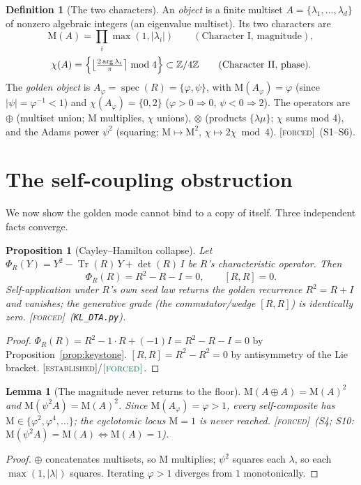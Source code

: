 \documentclass[11pt]{article}
\theoremstyle{plain}
\newtheorem{proposition}[theorem]{Proposition}
\newtheorem{lemma}[theorem]{Lemma}
\theoremstyle{definition}
\newtheorem{definition}[theorem]{Definition}
\theoremstyle{remark}
\newcommand{\forced}{\textup{\textcolor{forcedc}{\textsc{[forced]}}}}
\newcommand{\established}{\textup{\textcolor{estabc}{\textsc{[established]}}}}
\newcommand{\Z}{\mathbb{Z}}
\newcommand{\tr}{\operatorname{Tr}}
\newcommand{\Mah}{\mathrm{M}}
\newcommand{\abs}[1]{\left\lvert #1 \right\rvert}
\begin{document}
\begin{definition}[The two characters]\label{def:chars}
An \emph{object} is a finite multiset $A=\{\lambda_1,\dots,\lambda_d\}$ of nonzero algebraic integers
(an eigenvalue multiset). Its two characters are
\[
\Mah(A)=\prod_i\max(1,\abs{\lambda_i})\qquad(\text{Character I, magnitude}),
\]
\[
\chi(A)=\Bigl\{\bigl\lfloor \tfrac{2\arg\lambda_i}{\pi}\bigr\rceil \bmod 4\Bigr\}\subset\Z/4\Z
\qquad(\text{Character II, phase}).
\]
The \emph{golden object} is $A_\varphi=\operatorname{spec}(R)=\{\varphi,\psi\}$, with
$\Mah(A_\varphi)=\varphi$ (since $\abs\psi=\varphi^{-1}<1$) and $\chi(A_\varphi)=\{0,2\}$
($\varphi>0\Rightarrow0$, $\psi<0\Rightarrow2$). The operators are $\oplus$ (multiset union;
$\Mah$ multiplies, $\chi$ unions), $\otimes$ (products $\{\lambda\mu\}$; $\chi$ sums mod $4$), and the
Adams power $\psi^2$ (squaring; $\Mah\mapsto\Mah^2$, $\chi\mapsto 2\chi \bmod 4$). \forced\ (S1--S6).
\end{definition}

\section{The self-coupling obstruction}\label{sec:obstruction}

We now show the golden mode cannot bind to a copy of itself. Three independent facts converge.

\begin{proposition}[Cayley--Hamilton collapse]\label{prop:collapse}
Let $\Phi_R(Y)=Y^2-\tr(R)\,Y+\det(R)\,I$ be $R$'s characteristic operator. Then
\begin{equation}\label{eq:phicollapse}
\Phi_R(R)=R^2-R-I=0,\qquad [R,R]=0.
\end{equation}
Self-application under $R$'s own seed law returns the golden recurrence $R^2=R+I$ and vanishes; the
\emph{generative} grade (the commutator/wedge $[R,R]$) is identically zero. \forced\ (\texttt{KL\_DTA.py}).
\end{proposition}
\begin{proof}
$\Phi_R(R)=R^2-1\cdot R+(-1)I=R^2-R-I=0$ by Proposition~\ref{prop:keystone}. $[R,R]=R^2-R^2=0$ by
antisymmetry of the Lie bracket. \established/$\forced$.
\end{proof}

\begin{lemma}[The magnitude never returns to the floor]\label{lem:grow}
$\Mah(A\oplus A)=\Mah(A)^2$ and $\Mah(\psi^2A)=\Mah(A)^2$. Since $\Mah(A_\varphi)=\varphi>1$, every
self-composite has $\Mah\in\{\varphi^2,\varphi^4,\dots\}$; the cyclotomic locus $\Mah=1$ is never
reached. \forced\ (S4; S10: $\Mah(\psi^2A)=\Mah(A)\iff\Mah(A)=1$).
\end{lemma}
\begin{proof}
$\oplus$ concatenates multisets, so $\Mah$ multiplies; $\psi^2$ squares each $\lambda$, so each
$\max(1,\abs\lambda)$ squares. Iterating $\varphi>1$ diverges from $1$ monotonically.
\end{proof}
\end{document}
